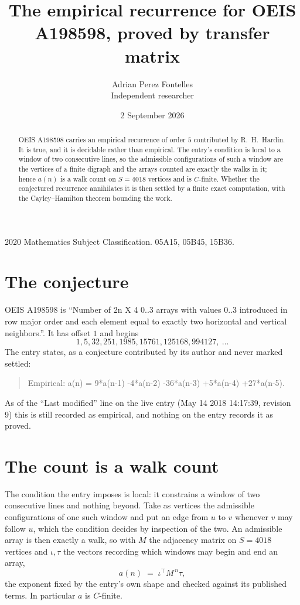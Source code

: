 \documentclass[11pt,a4paper]{article}
\title{The empirical recurrence for OEIS A198598, proved by transfer matrix}
\author{Adrian Perez Fontelles\\ \small Independent researcher}
\date{2 September 2026}
\theoremstyle{plain}
\theoremstyle{definition}
\begin{document}
\maketitle

\begin{abstract}
OEIS A198598 carries an empirical recurrence of order $5$ contributed by R.~H.~Hardin. It is
true, and it is decidable rather than empirical. The entry's condition is local to a window of two consecutive lines, so
the admissible configurations of such a window are the vertices of a finite digraph and the
arrays counted are exactly the walks in it; hence $a(n)$ is a walk count on $S=4018$ vertices
and is $C$-finite. Whether the conjectured recurrence annihilates it is then settled by a
finite exact computation, with the Cayley--Hamilton theorem bounding the work.
\end{abstract}

\noindent\small 2020 Mathematics Subject Classification. 05A15, 05B45, 15B36.\normalsize

\section{The conjecture}

OEIS A198598 is ``Number of 2n X 4 0..3 arrays with values 0..3 introduced in row major order and each element equal to exactly two horizontal and vertical neighbors.''. It has offset $1$ and begins
\[
1, 5, 32, 251, 1985, 15761, 125168, 994127,\ \dots
\]
The entry states, as a conjecture contributed by its author and never marked settled:
\begin{quote}
Empirical: a(n) = 9*a(n-1) -4*a(n-2) -36*a(n-3) +5*a(n-4) +27*a(n-5).
\end{quote}
As of the ``Last modified'' line on the live entry (May 14 2018 14:17:39, revision 9) this is still
recorded as empirical, and nothing on the entry records it as proved.

\section{The count is a walk count}

The condition the entry imposes is local: it constrains a window of two consecutive lines and nothing beyond. Take as
vertices the admissible configurations of one such window and put an edge from $u$ to $v$
whenever $v$ may follow $u$, which the condition decides by inspection of the two. An
admissible array is then exactly a walk, so with $M$ the adjacency matrix on $S=4018$ vertices
and $\iota,\tau$ the vectors recording which windows may begin and end an array,
\[
a(n)\;=\;\iota^{\!\top}M^{\,n}\tau ,
\]
the exponent fixed by the entry's own shape and checked against its published terms. In
particular $a$ is $C$-finite.
\end{document}
